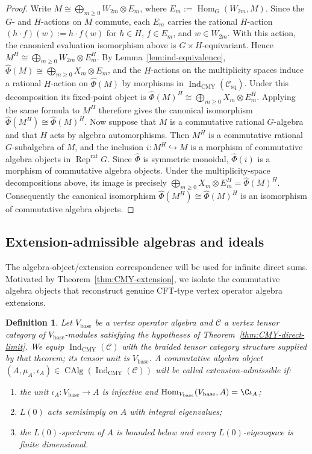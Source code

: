 \documentclass[12pt,leqno]{amsart}
\numberwithin{equation}{section} \newtheorem{thm}{Theorem}[section] \newtheorem{lem}[thm]{Lemma} \newtheorem{ex}[thm]{Example} \newtheorem{prop}[thm]{Proposition} \newtheorem{cor}[thm]{Corollary} \newtheorem{defi}[thm]{Definition} \newtheorem{rmk}[thm]{Remark} \newtheorem{notation}[thm]{Notation}
\newcommand{\Rep}{\operatorname{Rep}}
\newcommand{\Hom}{\operatorname{Hom}}
\newcommand{\Csq}{\mathcal C_{\mathrm{sq}}}
\newcommand{\CAlg}{\operatorname{CAlg}}
\newcommand{\IndCMY}{\operatorname{Ind}_{\mathrm{CMY}}}
\begin{document}
\begin{proof}
Write \(M\cong\bigoplus_{m\ge0}W_{2m}\otimes E_m\), where \(E_m:=\Hom_G(W_{2m},M)\). Since the $G$- and $H$-actions on $M$ commute, each $E_m$ carries the rational $H$-action \((h\cdot f)(w):=h\cdot f(w)\) for $h\in H$, $f\in E_m$, and $w\in W_{2m}$. With this action, the canonical evaluation isomorphism above is $G\times H$-equivariant. Hence \(M^H\cong\bigoplus_{m\ge0}W_{2m}\otimes E_m^H\). By Lemma~\ref{lem:ind-equivalence}, \(\widehat\Phi(M)\cong\bigoplus_{m\ge0}X_m\otimes E_m\), and the $H$-actions on the multiplicity spaces induce a rational $H$-action on $\widehat\Phi(M)$ by morphisms in $\IndCMY(\Csq)$. Under this decomposition its fixed-point object is \(\widehat\Phi(M)^H\cong\bigoplus_{m\ge0}X_m\otimes E_m^H\). Applying the same formula to $M^H$ therefore gives the canonical isomorphism \(\widehat\Phi(M^H)\cong\widehat\Phi(M)^H\). Now suppose that $M$ is a commutative rational $G$-algebra and that $H$ acts by algebra automorphisms. Then $M^H$ is a commutative rational $G$-subalgebra of $M$, and the inclusion \(i:M^H\hookrightarrow M\) is a morphism of commutative algebra objects in $\Rep^{\mathrm{rat}}G$. Since $\widehat\Phi$ is symmetric monoidal, $\widehat\Phi(i)$ is a morphism of commutative algebra objects. Under the multiplicity-space decompositions above, its image is precisely \(\bigoplus_{m\ge0}X_m\otimes E_m^H=\widehat\Phi(M)^H\). Consequently the canonical isomorphism \(\widehat\Phi(M^H)\cong\widehat\Phi(M)^H\) is an isomorphism of commutative algebra objects.
\end{proof}

\subsection{Extension-admissible algebras and ideals}

The algebra-object/extension correspondence will be used for infinite direct sums. Motivated by Theorem~\ref{thm:CMY-extension}, we isolate the commutative algebra objects that reconstruct genuine CFT-type vertex operator algebra extensions.

\begin{defi}\label{def:extension-admissible}
Let $V_{\mathrm{base}}$ be a vertex operator algebra and $\mathcal C$ a vertex tensor category of $V_{\mathrm{base}}$-modules satisfying the hypotheses of Theorem~\ref{thm:CMY-direct-limit}. We equip $\IndCMY(\mathcal C)$ with the braided tensor category structure supplied by that theorem; its tensor unit is $V_{\mathrm{base}}$. A commutative algebra object $(A,\mu_A,\iota_A)\in\CAlg(\IndCMY(\mathcal C))$ will be called \emph{extension-admissible} if:
\begin{enumerate}[label=(\roman*),leftmargin=2.1em]
\item the unit \(\iota_A:V_{\mathrm{base}}\to A\) is injective and
\(\Hom_{V_{\mathrm{base}}}(V_{\mathrm{base}},A)=\C\iota_A\);
\item $L(0)$ acts semisimply on $A$ with integral eigenvalues;
\item the $L(0)$-spectrum of $A$ is bounded below and every $L(0)$-eigenspace is finite dimensional.
\end{enumerate}
\end{defi}
\end{document}
